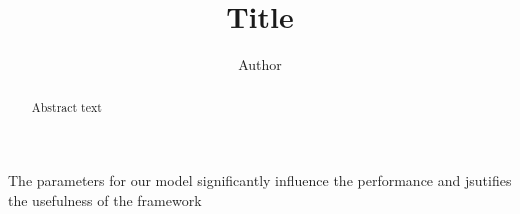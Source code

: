 \documentclass[a4paper]{article}
\title{Title}
\author{Author}
\begin{document}
\maketitle
\begin{abstract}
  Abstract text
\end{abstract}

The parameters for our model significantly influence the performance and jsutifies the usefulness of the framework
\end{document}

